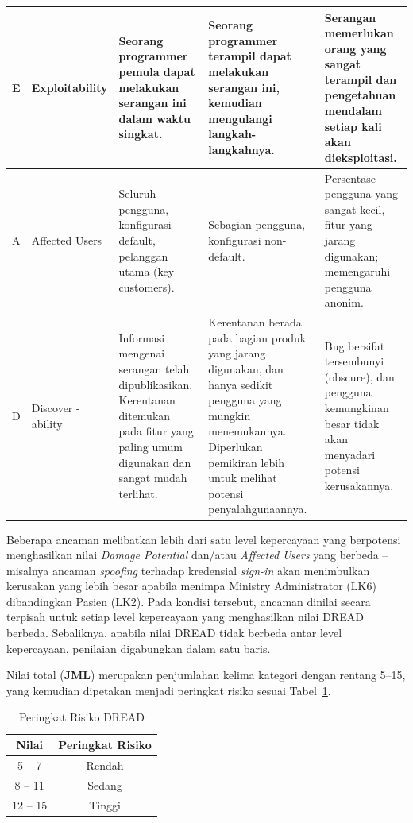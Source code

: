 \begin{xltabular}{\textwidth}{|>{\centering\arraybackslash}p{0.6cm}|>{\raggedright\arraybackslash}p{2.2cm}|>{\raggedright\arraybackslash}X|>{\raggedright\arraybackslash}X|>{\raggedright\arraybackslash}X|}
    E &
    Exploitability &
    Seorang programmer pemula dapat melakukan serangan ini dalam waktu singkat. &
    Seorang programmer terampil dapat melakukan serangan ini, kemudian mengulangi langkah-langkahnya. &
    Serangan memerlukan orang yang sangat terampil dan pengetahuan mendalam setiap kali akan dieksploitasi. \\
    \hline

    A &
    Affected Users &
    Seluruh pengguna, konfigurasi default, pelanggan utama (key customers). &
    Sebagian pengguna, konfigurasi non-default. &
    Persentase pengguna yang sangat kecil, fitur yang jarang digunakan; memengaruhi pengguna anonim. \\
    \hline

    D &
    Discover - ability &
    Informasi mengenai serangan telah dipublikasikan. Kerentanan ditemukan pada fitur yang paling umum digunakan dan sangat mudah terlihat. &
    Kerentanan berada pada bagian produk yang jarang digunakan, dan hanya sedikit pengguna yang mungkin menemukannya. Diperlukan pemikiran lebih untuk melihat potensi penyalahgunaannya. &
    Bug bersifat tersembunyi (obscure), dan pengguna kemungkinan besar tidak akan menyadari potensi kerusakannya. \\
    \hline

\end{xltabular}


Beberapa ancaman melibatkan lebih dari satu level kepercayaan yang berpotensi menghasilkan nilai \textit{Damage Potential} dan/atau \textit{Affected Users} yang berbeda -- misalnya ancaman \textit{spoofing} terhadap kredensial \textit{sign-in} akan menimbulkan kerusakan yang lebih besar apabila menimpa Ministry Administrator (LK6) dibandingkan Pasien (LK2). Pada kondisi tersebut, ancaman dinilai secara terpisah untuk setiap level kepercayaan yang menghasilkan nilai DREAD berbeda. Sebaliknya, apabila nilai DREAD tidak berbeda antar level kepercayaan, penilaian digabungkan dalam satu baris.

Nilai total (\textbf{JML}) merupakan penjumlahan kelima kategori dengan rentang 5--15, yang kemudian dipetakan menjadi peringkat risiko sesuai Tabel~\ref{tab:peringkat-risiko}.

\begin{table}[h]
\centering
\caption{Peringkat Risiko DREAD}
\label{tab:peringkat-risiko}
\begin{tabular}{|c|c|}
\hline
\textbf{Nilai} & \textbf{Peringkat Risiko} \\
\hline
5 -- 7 & Rendah \\
\hline
8 -- 11 & Sedang \\
\hline
12 -- 15 & Tinggi \\
\hline
\end{tabular}
\end{table}


